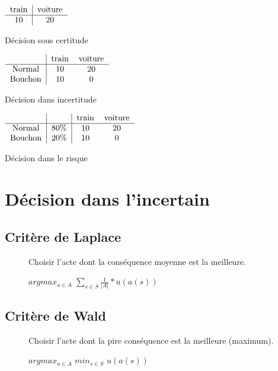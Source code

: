 \begin{center}
$\begin{tabular}{c|c}
train & voiture\\
\hline
10 & 20 \\
\end{tabular}$
\end{center}
\begin{center}
Décision sous certitude
\end{center}
\vspace{1.5cm}
\begin{center}
$\begin{tabular}{c|cc}
\  & train & voiture\\
\hline
Normal & 10 & 20\\
Bouchon & 10 & 0 \\
\end{tabular}$
\end{center}
\begin{center}
Décision dans incertitude
\end{center}
\vspace{1.5cm}
\begin{center}
$\begin{tabular}{c|c|cc}
\  & \  & train & voiture\\
\hline
Normal & 80\% & 10 & 20\\
Bouchon & 20\% & 10 & 0 \\
\end{tabular}$
\end{center}
\begin{center}
Décision dans le risque
\end{center}

\pagebreak
\section{Décision dans l'incertain}

\subsection{Critère de Laplace}
\begin{description}
\item[] Choisir l'acte dont la conséquence moyenne est la meilleure.
\item[] $argmax_{a \in A}$ $\sum_{s \in S} \frac{1}{|A|} * u(a(s))$
\end{description}

\subsection{Critère de Wald}
\begin{description}
\item[] Choisir l'acte dont la pire conséquence est la meilleure (maximum).
\item[] $argmax_{a \in A}$ $min_{s \in S}$ $u(a(s))$
\end{description}

